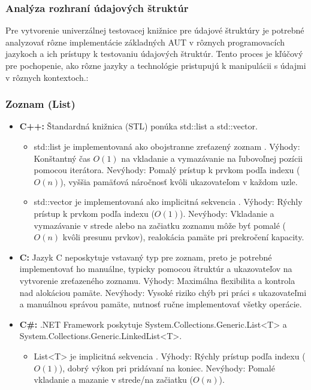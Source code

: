 \documentclass[11pt]{article}
\begin{document}
\subsubsection{Analýza rozhraní údajových štruktúr}

Pre vytvorenie univerzálnej testovacej knižnice pre údajové štruktúry je potrebné analyzovať rôzne implementácie základných AUT v rôznych programovacích jazykoch a ich prístupy k testovaniu údajových štruktúr. Tento proces je kľúčový pre pochopenie, ako rôzne jazyky a technológie pristupujú k manipulácii s údajmi v rôznych kontextoch.:

\subsubsection*{Zoznam (List)}

\begin{itemize}
  \item \textbf{C++:} Štandardná knižnica (STL) ponúka std::list a std::vector.
  \begin{itemize}
    \item std::list je implementovaná ako obojstranne zreťazený zoznam \cite{c++_containers}.
    Výhody: Konštantný čas $O(1)$ na vkladanie a vymazávanie na ľubovoľnej pozícii pomocou iterátora.
    Nevýhody: Pomalý prístup k prvkom podľa indexu ($O(n)$), vyššia pamäťová náročnosť kvôli ukazovateľom v každom uzle.
    \item std::vector je implementovaná ako implicitná sekvencia \cite{c++_containers}.
    Výhody: Rýchly prístup k prvkom podľa indexu ($O(1)$).
    Nevýhody: Vkladanie a vymazávanie v strede alebo na začiatku zoznamu môže byť pomalé ($O(n)$ kvôli presunu prvkov), realokácia pamäte pri prekročení kapacity.
  \end{itemize}
  \item \textbf{C:} Jazyk C neposkytuje vstavaný typ pre zoznam, preto je potrebné implementovať ho manuálne, typicky pomocou štruktúr a ukazovateľov na vytvorenie zreťazeného zoznamu.
  Výhody: Maximálna flexibilita a kontrola nad alokáciou pamäte.
  Nevýhody: Vysoké riziko chýb pri práci s ukazovateľmi a manuálnou správou pamäte, nutnosť ručne implementovať všetky operácie.
  \item \textbf{C\#:} .NET Framework poskytuje System.Collections.Generic.List<T> a System.Collections.Generic.LinkedList<T>.
  \begin{itemize}
    \item List<T> je implicitná sekvencia \cite{dotnet_docs}. Výhody: Rýchly prístup podľa indexu ($O(1)$), dobrý výkon pri pridávaní na koniec. Nevýhody: Pomalé vkladanie a mazanie v strede/na začiatku ($O(n)$).

\end{itemize}
\end{itemize}
\end{document}
